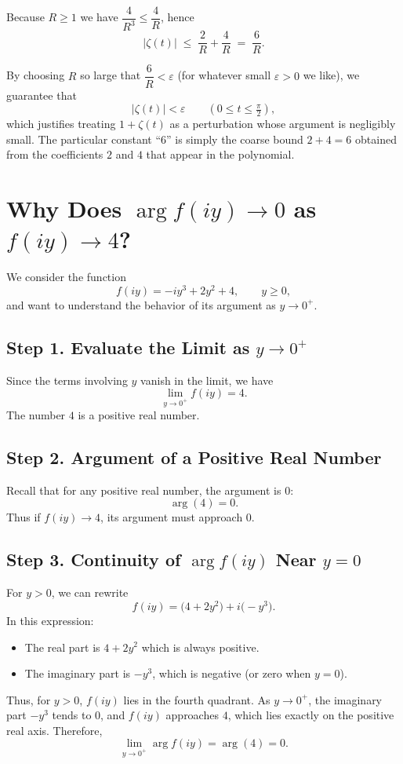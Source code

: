 \documentclass[12pt]{article}
\theoremstyle{definition} %
\theoremstyle{plain} %
\begin{document}
Because \(R\ge 1\) we have \(\dfrac{4}{R^{3}}\le\dfrac{4}{R}\), hence
\[
   \bigl\lvert\zeta(t)\bigr\rvert
   \;\le\;
   \frac{2}{R}+\frac{4}{R}
   \;=\;
   \frac{6}{R}.
\]

By choosing \(R\) so large that \(\dfrac{6}{R}<\varepsilon\) (for whatever small \(\varepsilon>0\) we like), we guarantee that
\[
   \bigl\lvert\zeta(t)\bigr\rvert<\varepsilon
   \qquad(0\le t\le\tfrac{\pi}{2}),
\]
which justifies treating \(1+\zeta(t)\) as a perturbation whose argument is negligibly small.  The particular constant “\(6\)” is simply the coarse bound
\(
   2+4=6
\)
obtained from the coefficients \(2\) and \(4\) that appear in the polynomial.

\section*{Why Does \(\arg f(iy) \to 0\) as \(f(iy)\to 4\)?}

We consider the function
\[
    f(iy) = -iy^3 + 2y^2 + 4, \qquad y\ge0,
\]
and want to understand the behavior of its argument as \(y\to 0^+\).

\subsection*{Step 1. Evaluate the Limit as \(y\to 0^+\)}
Since the terms involving \(y\) vanish in the limit, we have
\[
    \lim_{y\to 0^+} f(iy) = 4.
\]
The number \(4\) is a positive real number.

\subsection*{Step 2. Argument of a Positive Real Number}
Recall that for any positive real number, the argument is \(0\):
\[
    \arg(4) = 0.
\]
Thus if \(f(iy) \to 4\), its argument must approach \(0\).

\subsection*{Step 3. Continuity of \(\arg f(iy)\) Near \(y = 0\)}
For \(y>0\), we can rewrite
\[
    f(iy) = \bigl(4 + 2y^2\bigr) + i\bigl(-y^3\bigr).
\]
In this expression:
\begin{itemize}
    \item The real part is \(4+2y^2\) which is always positive.
    \item The imaginary part is \(-y^3\), which is negative (or zero when \(y=0\)).
\end{itemize}
Thus, for \(y>0\), \(f(iy)\) lies in the fourth quadrant. As \(y\to0^+\), the imaginary part \(-y^3\) tends to \(0\), and \(f(iy)\) approaches \(4\), which lies exactly on the positive real axis. Therefore,
\[
    \lim_{y\to 0^+} \arg f(iy) = \arg(4) = 0.
\]
\end{document}
